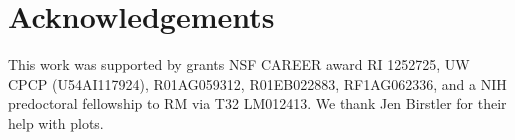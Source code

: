 \section*{Acknowledgements}
This work was supported by grants NSF CAREER award RI 1252725, UW CPCP (U54AI117924), R01AG059312, R01EB022883, RF1AG062336, 
and a NIH predoctoral fellowship to RM via T32 LM012413. We thank Jen Birstler for their help with plots.
